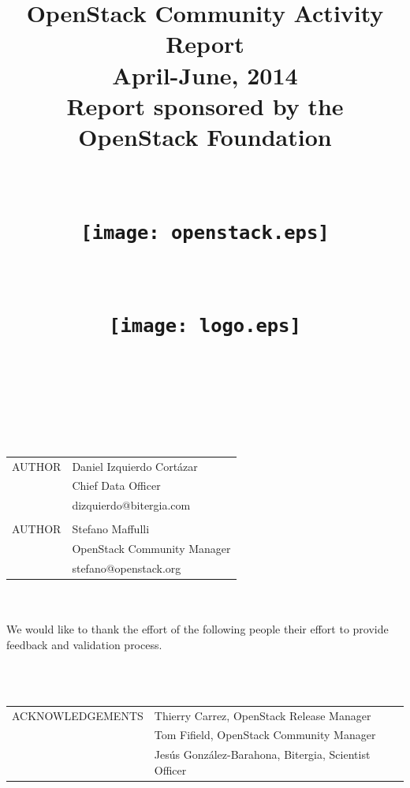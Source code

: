 \documentclass[a4wide,11pt]{report}
\begin{document}
\title{OpenStack Community Activity Report\\
      April-June, 2014 \\
      Report sponsored by the OpenStack Foundation\\
      ~~\\~~\\  \texttt{[image: openstack.eps]}       \\
        ~~\\~~\\  \texttt{[image: logo.eps]}       \\}




\maketitle


\newpage
~~\\~\\~\\~\\
\begin{tabular}{p{5cm}p{10cm}}
AUTHOR & Daniel Izquierdo Cort\'azar \\
       & Chief Data Officer  \\
       & dizquierdo@bitergia.com \\
       &  \\
AUTHOR  & Stefano Maffulli \\
        & OpenStack Community Manager \\
        & stefano@openstack.org \\
\end{tabular}

~~\\~~\\

We would like to thank the effort of the following people their effort to provide feedback and validation process. 

~~\\
~~\\

\begin{tabular}{p{5cm}p{10cm}}
ACKNOWLEDGEMENTS & Thierry Carrez, OpenStack Release Manager \\
                 & Tom Fifield, OpenStack Community Manager \\
                 & Jes\'us Gonz\'alez-Barahona, Bitergia, Scientist Officer \\
\end{tabular}
\end{document}
